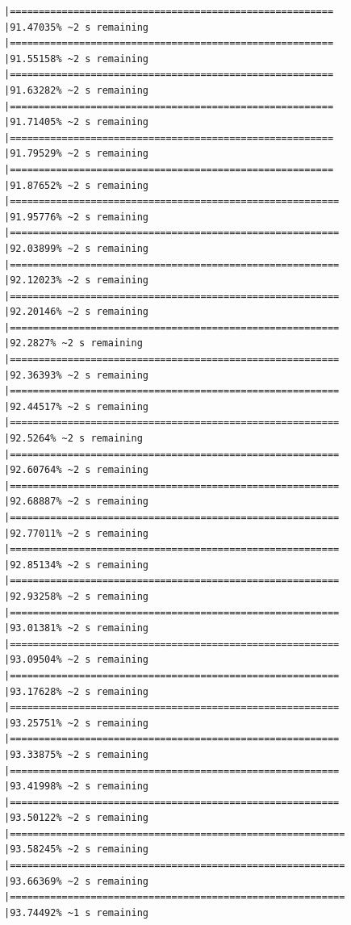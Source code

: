 \documentclass{article}\usepackage[]{graphicx}\usepackage[]{xcolor}
\makeatletter
\newenvironment{kframe}{%
 \def\at@end@of@kframe{}%
 \ifinner\ifhmode%
  \def\at@end@of@kframe{\end{minipage}}%
  \begin{minipage}{\columnwidth}%
 \fi\fi%
 \def\FrameCommand##1{\hskip\@totalleftmargin \hskip-\fboxsep
 \colorbox{shadecolor}{##1}\hskip-\fboxsep
     \hskip-\linewidth \hskip-\@totalleftmargin \hskip\columnwidth}%
 \MakeFramed {\advance\hsize-\width
   \@totalleftmargin\z@ \linewidth\hsize
   \@setminipage}}%
 {\par\unskip\endMakeFramed%
 \at@end@of@kframe}
\newenvironment{knitrout}{}{} %
\makeatother
\begin{document}
\begin{knitrout}
\begin{kframe}
\begin{verbatim}
|========================================================      |91.47035% ~2 s remaining  
|========================================================      |91.55158% ~2 s remaining  
|========================================================      |91.63282% ~2 s remaining  
|========================================================      |91.71405% ~2 s remaining  
|========================================================      |91.79529% ~2 s remaining  
|========================================================      |91.87652% ~2 s remaining  
|=========================================================     |91.95776% ~2 s remaining  
|=========================================================     |92.03899% ~2 s remaining  
|=========================================================     |92.12023% ~2 s remaining  
|=========================================================     |92.20146% ~2 s remaining  
|=========================================================     |92.2827% ~2 s remaining   
|=========================================================     |92.36393% ~2 s remaining  
|=========================================================     |92.44517% ~2 s remaining  
|=========================================================     |92.5264% ~2 s remaining   
|=========================================================     |92.60764% ~2 s remaining  
|=========================================================     |92.68887% ~2 s remaining  
|=========================================================     |92.77011% ~2 s remaining  
|=========================================================     |92.85134% ~2 s remaining  
|=========================================================     |92.93258% ~2 s remaining  
|=========================================================     |93.01381% ~2 s remaining  
|=========================================================     |93.09504% ~2 s remaining  
|=========================================================     |93.17628% ~2 s remaining  
|=========================================================     |93.25751% ~2 s remaining  
|=========================================================     |93.33875% ~2 s remaining  
|=========================================================     |93.41998% ~2 s remaining  
|=========================================================     |93.50122% ~2 s remaining  
|==========================================================    |93.58245% ~2 s remaining  
|==========================================================    |93.66369% ~2 s remaining  
|==========================================================    |93.74492% ~1 s remaining  

\end{verbatim}
\end{kframe}
\end{knitrout}
\end{document}
